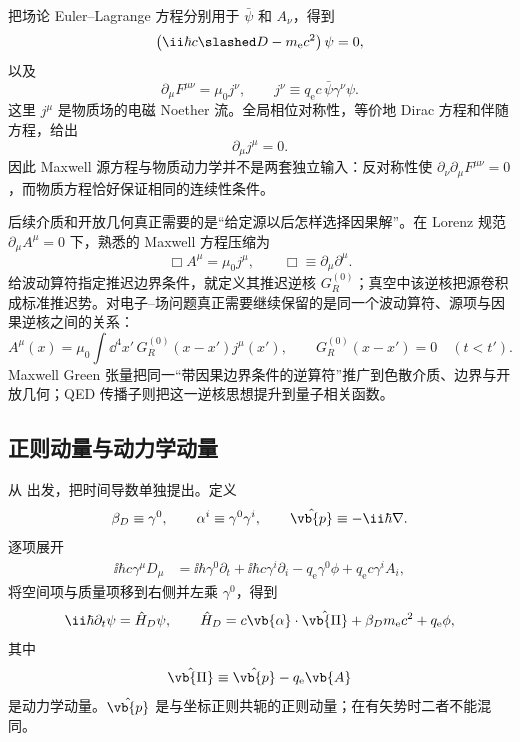 把场论 Euler--Lagrange 方程分别用于 $\bar\psi$ 和 $A_\nu$，得到
\begin{equation}
 {
 \left(\ii\hbar c\slashed D-m_{\mathrm e} c^2\right)\psi=0,}
 \label{eq:dirac-em}
\end{equation}
以及
\begin{equation}
 {
 \partial_\mu F^{\mu\nu}=\mu_0 j^\nu,
 \qquad
 j^\nu\equiv q_{\mathrm e} c\,\bar\psi\gamma^\nu\psi.}
 \label{eq:maxwell-source}
\end{equation}
这里 $j^\mu$ 是物质场的电磁 Noether 流。全局相位对称性，等价地 Dirac 方程和伴随方程，给出
\begin{equation}
 {\partial_\mu j^\mu=0.}
 \label{eq:current-conservation}
\end{equation}
因此 Maxwell 源方程与物质动力学并不是两套独立输入：反对称性使 $\partial_\nu\partial_\mu F^{\mu\nu}=0$，而物质方程恰好保证相同的连续性条件。

后续介质和开放几何真正需要的是“给定源以后怎样选择因果解”。在 Lorenz 规范 $\partial_\mu A^\mu=0$ 下，熟悉的 Maxwell 方程压缩为
\begin{equation*}
 \Box A^\mu=\mu_0j^\mu,
 \qquad
 \Box\equiv\partial_\mu\partial^\mu.
\end{equation*}
给波动算符指定推迟边界条件，就定义其推迟逆核 $G_R^{(0)}$；真空中该逆核把源卷积成标准推迟势。对电子--场问题真正需要继续保留的是同一个波动算符、源项与因果逆核之间的关系：
\begin{equation*}
 A^\mu(x)=\mu_0\int\dd^4 x'\,G_R^{(0)}(x-x')j^\mu(x'),
 \qquad
 G_R^{(0)}(x-x')=0\quad(t<t').
\end{equation*}
Maxwell Green 张量把同一“带因果边界条件的逆算符”推广到色散介质、边界与开放几何；QED 传播子则把这一逆核思想提升到量子相关函数。

\subsection{正则动量与动力学动量}\label{sec:feqo-minimal-coupling}

从  出发，把时间导数单独提出。定义
\begin{equation*}
 \beta_D\equiv\gamma^0,
 \qquad
 \alpha^i\equiv\gamma^0\gamma^i,
 \qquad
 \hat{\vb{p}}\equiv-\ii\hbar\nabla.
\end{equation*}
逐项展开
\begin{align*}
 \ii\hbar c\gamma^\mu D_\mu
 &=\ii\hbar\gamma^0\partial_t
 +\ii\hbar c\gamma^i\partial_i
 -q_{\mathrm e}\gamma^0\phi
 +q_{\mathrm e} c\gamma^i A_i,
\end{align*}
将空间项与质量项移到右侧并左乘 $\gamma^0$，得到
\begin{equation}
 {
 \ii\hbar\partial_t\psi
 =\hat H_D\psi,
 \qquad
 \hat H_D
 =c\vb{\alpha}\cdot\hat{\vb{\Pi}}
 +\beta_D m_{\mathrm e} c^2+q_{\mathrm e}\phi,
 }
 \label{eq:field-dirac-hamiltonian-em}\end{equation}
其中
\begin{equation}
 \hat{\vb{\Pi}}\equiv\hat{\vb{p}}-q_{\mathrm e}\vb{A}
 \label{eq:kinetic-momentum}
\end{equation}
是动力学动量。$\hat{\vb{p}}$ 是与坐标正则共轭的正则动量；在有矢势时二者不能混同。

